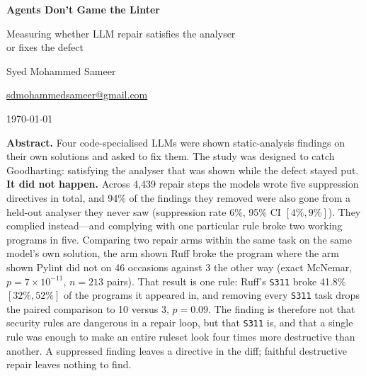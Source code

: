 \documentclass[11pt]{article}
\newcommand{\code}[1]{\texttt{\small #1}}
\begin{document}
\begin{center}
{\LARGE\bfseries\color{ink} Agents Don't Game the Linter\par}
\vspace{0.45em}
{\large\color{muted} Measuring whether LLM repair satisfies the analyser\\
or fixes the defect\par}
\vspace{1.3em}
{\normalsize Syed Mohammed Sameer\par}
\vspace{0.25em}
{\small\color{muted} \href{mailto:sdmohammedsameer@gmail.com}{sdmohammedsameer@gmail.com}\par}
\vspace{0.35em}
{\small\color{muted} \today\par}
\end{center}

\vspace{0.6em}

\begin{tcolorbox}[colback=panel, colframe=rule, boxrule=0.5pt, arc=2pt,
                  left=12pt, right=12pt, top=10pt, bottom=10pt]
\small
\textbf{Abstract.} Four code-specialised LLMs were shown static-analysis findings
on their own solutions and asked to fix them. The study was designed to catch
Goodharting: satisfying the analyser that was shown while the defect stayed put.
\textbf{It did not happen.} Across 4{,}439 repair steps the models wrote five
suppression directives in total, and 94\% of the findings they removed were also
gone from a held-out analyser they never saw (suppression rate 6\%, 95\% CI
$[4\%, 9\%]$). They complied instead---and complying with one particular rule
broke two working programs in five. Comparing two repair arms within the same
task on the same model's own solution, the arm shown Ruff broke the program where
the arm shown Pylint did not on 46 occasions against 3 the other way (exact
McNemar, $p = 7\times10^{-11}$, $n = 213$ pairs). That result is one rule:
Ruff's \code{S311} broke 41.8\% $[32\%, 52\%]$ of the programs it appeared in,
and removing every \code{S311} task drops the paired comparison to 10 versus 3,
$p = 0.09$. The finding is therefore not that security rules are dangerous in a
repair loop, but that \code{S311} is, and that a single rule was enough to make an
entire ruleset look four times more destructive than another. A suppressed
finding leaves a directive in the diff; faithful destructive repair leaves nothing
to find.
\end{tcolorbox}
\end{document}
